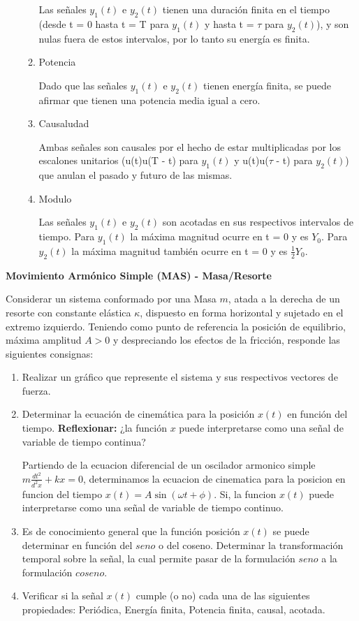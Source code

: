 \documentclass[12pt,a4paper]{report}
\begin{document}
\begin{enumerate}[label=\alph*)]
\begin{enumerate}[label=\alph*)]
    Las señales $y_1(t)$ e $y_2(t)$ tienen una duración finita en el tiempo (desde t = 0 hasta t = T para $y_1(t)$ y hasta t = $\tau$ para $y_2(t)$), y son nulas fuera de estos intervalos, por lo tanto su energía es finita.
    \item Potencia

    Dado que las señales $y_1(t)$ e $y_2(t)$ tienen energía finita, se puede afirmar que tienen una potencia media igual a cero.
    \item Causaludad

    Ambas señales son causales por el hecho de estar multiplicadas por los escalones unitarios (u(t)u(T - t) para $y_1(t)$ y  u(t)u($\tau$ - t) para $y_2(t)$) que anulan el pasado y futuro de las mismas.
    \item Modulo

    Las señales $y_1(t)$ e $y_2(t)$ son acotadas en sus respectivos intervalos de tiempo. Para $y_1(t)$ la máxima magnitud ocurre en t = 0 y es $Y_0$. Para $y_2(t)$ la máxima magnitud también ocurre en t = 0  y es $\frac{1}{2}Y_0$.
\end{enumerate}

\end{enumerate}

\textbf{Movimiento Armónico Simple (MAS) - Masa/Resorte}

Considerar un sistema conformado por una Masa $m$, atada a la derecha de un resorte con constante elástica $\kappa$, 
dispuesto en forma horizontal y sujetado en el extremo izquierdo. Teniendo como punto de referencia la posición de
equilibrio, máxima amplitud $A > 0$ y despreciando los efectos de la fricción, responde las siguientes consignas:

\begin{enumerate}[label=\alph*)]
  \item Realizar un gráfico que represente el sistema y sus respectivos vectores de fuerza.

  \item Determinar la ecuación de cinemática para la posición $x(t)$ en función del tiempo. \textbf{Reflexionar:} ¿la
    función $x$ puede interpretarse como una señal de variable de tiempo continua?

    Partiendo de la ecuacion diferencial de un oscilador armonico simple $m \frac{dt^2}{d^2x} + kx = 0$, determinamos la ecuacion de cinematica para la posicion en funcion del tiempo $x(t) = A \sin(\omega t + \phi)$. Si, la funcion $x(t)$ puede interpretarse como una señal de variable de tiempo continuo.

  \item Es de conocimiento general que la función posición $x(t)$ se puede determinar en función del $seno$ o del
    coseno. Determinar la transformación temporal sobre la señal, la cual permite pasar de la formulación $seno$ a la
    formulación $coseno$.

  \item Verificar si la señal $x(t)$ cumple (o no) cada una de las siguientes propiedades: Periódica, Energía finita,
    Potencia finita, causal, acotada.
\end{enumerate}
\end{document}
